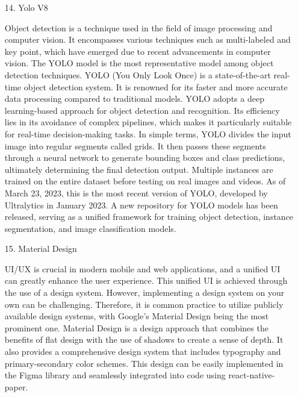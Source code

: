 \documentclass[conference, a4paper]{IEEEtran}
\begin{document}
\begin{enumerate}
\begin{enumerate}
        \item[14.]Yolo V8 \cite{datahunt-yolo-object-detection}
        \item[]Object detection is a technique used in the field of image processing and computer vision. It encompasses various techniques such as multi-labeled and key point, which have emerged due to recent advancements in computer vision. The YOLO model is the most representative model among object detection techniques. YOLO (You Only Look Once) is a state-of-the-art real-time object detection system. It is renowned for its faster and more accurate data processing compared to traditional models. YOLO adopts a deep learning-based approach for object detection and recognition. Its efficiency lies in its avoidance of complex pipelines, which makes it particularly suitable for real-time decision-making tasks. In simple terms, YOLO divides the input image into regular segments called grids. It then passes these segments through a neural network to generate bounding boxes and class predictions, ultimately determining the final detection output. Multiple instances are trained on the entire dataset before testing on real images and videos. As of March 23, 2023, this is the most recent version of YOLO, developed by Ultralytics in January 2023. A new repository for YOLO models has been released, serving as a unified framework for training object detection, instance segmentation, and image classification models. \\

        \item[15.]Material Design \cite{google-material-design}
        \item[]UI/UX is crucial in modern mobile and web applications, and a unified UI can greatly enhance the user experience. This unified UI is achieved through the use of a design system. However, implementing a design system on your own can be challenging. Therefore, it is common practice to utilize publicly available design systems, with Google's Material Design being the most prominent one. Material Design is a design approach that combines the benefits of flat design with the use of shadows to create a sense of depth. It also provides a comprehensive design system that includes typography and primary-secondary color schemes. This design can be easily implemented in the Figma library and seamlessly integrated into code using react-native-paper. \\


\end{enumerate}
\end{enumerate}
\end{document}
